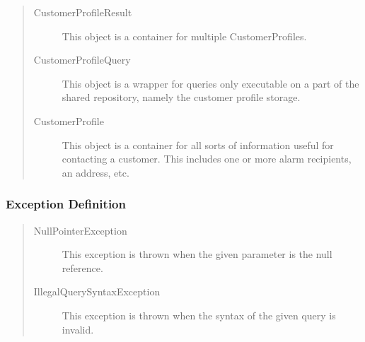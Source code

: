 \begin{quote}
	\begin{description}
		\item[CustomerProfileResult] This object is a container for multiple
		CustomerProfiles.
		\item[CustomerProfileQuery] This object is a wrapper for queries only executable on a
		part of the shared repository, namely the customer profile storage.
		\item[CustomerProfile] This object is a container for all sorts of information useful
		for contacting a customer. This includes one or more alarm recipients, an
		address, etc.
	\end{description} 
\end{quote}

\subsubsection{Exception Definition} 

\begin{quote}
	\begin{description}
		\item[NullPointerException] This exception is thrown when the given parameter
		is the null reference.
		\item[IllegalQuerySyntaxException] This exception is thrown when the syntax of
		the given query is invalid.
	\end{description} 
\end{quote}